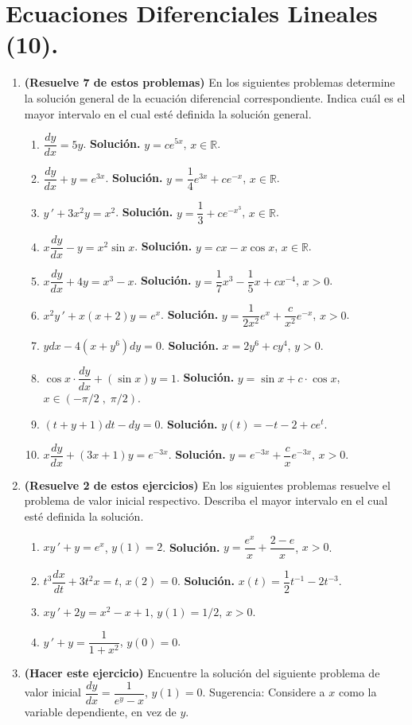 \documentclass[letterpaper,10pt]{memoir}
\begin{document}
\section*{Ecuaciones Diferenciales Lineales (10).} %
\begin{enumerate}
	\item \textbf{(Resuelve 7 de estos problemas)} En los siguientes problemas determine la solución general de la ecuación diferencial correspondiente. Indica cuál es el mayor intervalo en el cual esté definida la solución general.
		\begin{enumerate}
			\item \(\dfrac{dy}{dx} =5y\). \textbf{Solución.} \(y=ce^{5x}\), \(x \in \mathbb{R}\).
			\item \(\dfrac{dy}{dx} +y=e^{3x}\). \textbf{Solución.} \(y= \dfrac{1}{4} e^{3x} +ce^{-x}\), \(x \in \mathbb{R}\).
			\item \(y \,' +3x^2y=x^2\). \textbf{Solución.} \(y= \dfrac{1}{3} +ce^{-x^3}\), \(x \in \mathbb{R}\).
			\item \(x \dfrac{dy}{dx} -y=x^2 \sin x\). \textbf{Solución.} \(y=cx-x \cos x\), \(x \in \mathbb{R}\).
			\item \(x \dfrac{dy}{dx} +4y=x^3-x\). \textbf{Solución.} \(y= \dfrac{1}{7} x^3- \dfrac{1}{5} x+cx^{-4}\), \(x>0\).
			\item \(x^2y \,' +x(x+2) y=e^x\). \textbf{Solución.} \(y= \dfrac{1}{2x^2} e^x+ \dfrac{c}{x^2} e^{-x}\), \(x>0\).
			\item \(ydx-4(x+y^6) dy=0\). \textbf{Solución.} \(x=2y^6+cy^4\), \(y>0\).
			\item \(\cos x \cdot \dfrac{dy}{dx} + (\sin x) y=1\). \textbf{Solución.} \(y= \sin x+c \cdot \cos x\), \(x \in (- \pi /2 \;,\; \pi /2)\).
			\item \((t+y+1) dt-dy=0\). \textbf{Solución.} \(y(t) =-t-2+ce^t\).
			\item \(x \dfrac{dy}{dx} +(3x+1) y=e^{-3x}\). \textbf{Solución.} \(y=e^{-3x} + \dfrac{c}{x} e^{-3x}\), \(x>0\).
		\end{enumerate}
	\item \textbf{(Resuelve 2 de estos ejercicios)} En los siguientes problemas resuelve el problema de valor inicial respectivo. Describa el mayor intervalo en el cual esté definida la solución.
		\begin{enumerate}
			\item \(xy \,' +y=e^x\), \(y(1) =2\). \textbf{Solución.} \(y= \dfrac{e^x}{x} + \dfrac{2-e}{x}\), \(x>0\).
			\item \(t^3 \dfrac{dx}{dt} +3t^2x=t\), \(x(2) =0\). \textbf{Solución.} \(x(t) = \dfrac{1}{2} t^{-1} -2t^{-3}\).
			\item \(xy \,' +2y=x^2-x+1\), \(y(1) =1/2\), \(x>0\).
			\item \(y \,' +y= \dfrac{1}{1+x^2}\), \(y(0) =0\).
		\end{enumerate}
	\item \textbf{(Hacer este ejercicio)} Encuentre la solución del siguiente problema de valor inicial \(\dfrac{dy}{dx} = \dfrac{1}{e^y-x}\), \(y(1) =0\). Sugerencia: Considere a \(x\) como la variable dependiente, en vez de \(y\).
\end{enumerate}
\end{document}

